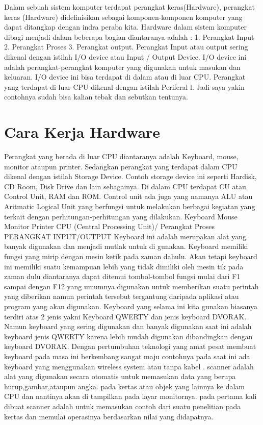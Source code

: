 Dalam sebuah sistem komputer terdapat perangkat keras(Hardware), perangkat keras (Hardware) didefinisikan sebagai komponen-komponen komputer yang dapat ditangkap dengan indra peraba kita. Hardware dalam sistem komputer dibagi menjadi dalam beberapa bagian diantaranya adalah : 1. Perangkat Input 2. Perangkat Proses 3. Perangkat output. Perangkat Input atau output sering dikenal dengan istilah I/O device atau Input / Output Device. I/O device ini adalah perangkat-perangkat komputer yang digunakan untuk masukan dan keluaran. I/O device ini bisa terdapat di dalam atau di luar CPU. Perangkat yang terdapat di luar CPU dikenal dengan istilah Periferal l. Jadi saya yakin contohnya sudah bisa kalian tebak dan sebutkan tentunya.
\section{Cara Kerja Hardware}
Perangkat yang berada di luar CPU diantaranya adalah Keyboard, mouse, monitor ataupun printer. Sedangkan perangkat yang terdapat dalam CPU dikenal dengan istilah Storage Device. Contoh storage device ini seperti Hardisk, CD Room, Disk Drive dan lain sebagainya. Di dalam CPU terdapat CU atau Control Unit, RAM dan ROM. Control unit ada juga yang namanya ALU atau Aritmatic Logical Unit yang berfungsi untuk melakukan berbagai kegiatan yang terkait dengan perhitungan-perhitungan yang dilakukan.
Keyboard Mouse Monitor Printer CPU (Central Processing Unit)/ Perangkat Proses PERANGKAT INPUT/OUTPUT Keyboard ini adalah merupakan alat yang banyak digunakan dan menjadi mutlak untuk di gunakan. Keyboard memiliki fungsi yang mirip dengan mesin ketik pada zaman dahulu. Akan tetapi keyboard ini memiliki  suatu kemampuan lebih yang tidak dimiliki oleh mesin tik pada zaman dulu diantaranya dapat ditemui tombol-tombol fungsi mulai dari F1 sampai dengan F12 yang umumnya digunakan untuk memberikan suatu perintah yang diberikan namun perintah tersebut tergantung daripada aplikasi atau program yang akan digunakan. Keyboard yang selama ini kita gunakan biasanya terdiri atas 2 jenis yakni Keyboard QWERTY dan jenis keyboard DVORAK. Namun keyboard yang sering digunakan dan banyak digunakan saat ini adalah keyboard jenis QWERTY karena lebih mudah digunakan dibandingkan dengan keyboard DVORAK. Dengan pertumbuhan teknologi yang amat pesat membuat keyboard pada masa ini berkembang sangat maju contohnya pada saat ini ada keyboard yang menggunakan wireless system atau tanpa kabel . scanner adalah alat yang digunakan secara otomatis untuk memasukan data yang berupa hurup,gambar,ataupun angka. pada kertas atau objek yang lainnya ke dalam CPU dan nantinya akan di tampilkan pada layar monitornya. pada pertama kali dibuat scanner adalah untuk memasukan contoh dari suatu penelitian pada kertas dan memulai operasinya berdasarkan nilai yang didapatnya. 
